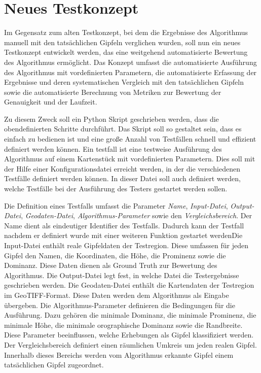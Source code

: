 \section{Neues Testkonzept} \label{sec:neues_testkonzept}
Im Gegensatz zum alten Testkonzept, bei dem die Ergebnisse des Algorithmus manuell mit den tatsächlichen Gipfeln verglichen wurden, soll nun ein neues Testkonzept entwickelt werden, das eine weitgehend automatisierte Bewertung des Algorithmus ermöglicht. Das Konzept umfasst die automatisierte Ausführung des Algorithmus mit vordefinierten Parametern, die automatisierte Erfassung der Ergebnisse und deren systematischen Vergleich mit den tatsächlichen Gipfeln sowie die automatisierte Berechnung von Metriken zur Bewertung der Genauigkeit und der Laufzeit. 

Zu diesem Zweck soll ein Python Skript geschrieben werden, dass die obendefinierten Schritte durchführt. Das Skript soll so gestaltet sein, dass es einfach zu bedienen ist und eine große Anzahl von Testfällen schnell und effizient definiert werden können. Ein testfall ist eine testweise Ausführung des Algorithmus auf einem Kartenstück mit vordefinierten Parametern. Dies soll mit der Hilfe einer Konfigurationsdatei erreicht werden, in der die verschiedenen Testfälle definiert werden können. In dieser Datei soll auch definiert werden, welche Testfälle bei der Ausführung des Testers gestartet werden sollen. 

Die Definition eines Testfalls umfasst die Parameter \textit{Name}, \textit{Input-Datei}, \textit{Output-Datei}, \textit{Geodaten-Datei}, \textit{Algorithmus-Parameter} sowie den \textit{Vergleichsbereich}. Der Name dient als eindeutiger Identifier des Testfalls. Dadurch kann der Testfall nachdem er definiert wurde mit einer weiteren Funktion gestartet werdenDie Input-Datei enthält reale Gipfeldaten der Testregion. Diese umfassen für jeden Gipfel den Namen, die Koordinaten, die Höhe, die Prominenz sowie die Dominanz. Diese Daten dienen als Ground Truth zur Bewertung des Algorithmus. Die Output-Datei legt fest, in welche Datei die Testergebnisse geschrieben werden. Die Geodaten-Datei enthält die Kartendaten der Testregion im GeoTIFF-Format. Diese Daten werden dem Algorithmus als Eingabe übergeben. Die Algorithmus-Parameter definieren die Bedingungen für die Ausführung. Dazu gehören die minimale Dominanz, die minimale Prominenz, die minimale Höhe, die minimale orographische Dominanz sowie die Randbreite. Diese Parameter beeinflussen, welche Erhebungen als Gipfel klassifiziert werden. Der Vergleichsbereich definiert einen räumlichen Umkreis um jeden realen Gipfel. Innerhalb dieses Bereichs werden vom Algorithmus erkannte Gipfel einem tatsächlichen Gipfel zugeordnet. 

